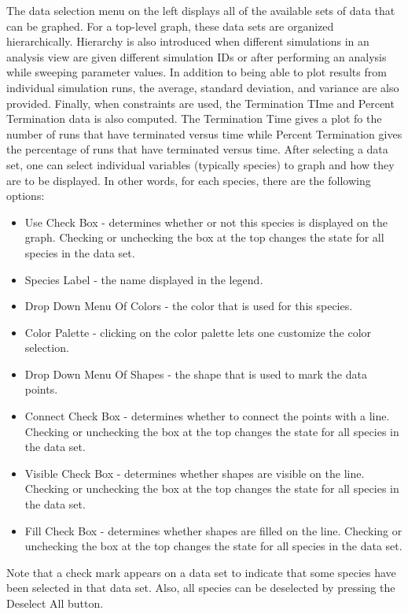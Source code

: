 \documentclass[titlepage,11pt]{article}
\begin{document}
The data selection menu on the left displays all of the available sets of data that can be graphed.  For a top-level graph, these data sets are organized hierarchically.  Hierarchy is also introduced when different simulations in an analysis view are given different simulation IDs or after performing an analysis while sweeping parameter values.  In addition to being able to plot results from individual simulation runs, the average, standard deviation, and variance are also provided.  Finally, when constraints are used, the Termination TIme and Percent Termination data is also computed.  The Termination Time gives a plot fo the number of runs that have terminated versus time while Percent Termination gives the percentage of runs that have terminated versus time.
After selecting a data set, one can select individual variables (typically species) to graph and how they are to be displayed.  In other words, for each species, there are the following options: 
\begin{itemize}
\item Use Check Box - determines whether or not this species is displayed on the graph.  Checking or unchecking the box at the top changes the state for all species in the data set. 
\item Species Label - the name displayed in the legend. 
\item Drop Down Menu Of Colors - the color that is used for this species. 
\item Color Palette - clicking on the color palette lets one customize the color selection. 
\item Drop Down Menu Of Shapes - the shape that is used to mark the data points. 
\item Connect Check Box - determines whether to connect the points with a line.  Checking or unchecking the box at the top changes the state for all species in the data set. 
\item Visible Check Box - determines whether shapes are visible on the line.  Checking or unchecking the box at the top changes the state for all species in the data set.
\item Fill Check Box - determines whether shapes are filled on the line.  Checking or  unchecking the box at the top changes the state for all species in the data set.
\end{itemize}
Note that a check mark appears on a data set to indicate that some species have been selected in that data set. Also, all species can be deselected by pressing the Deselect All button.
\end{document}
